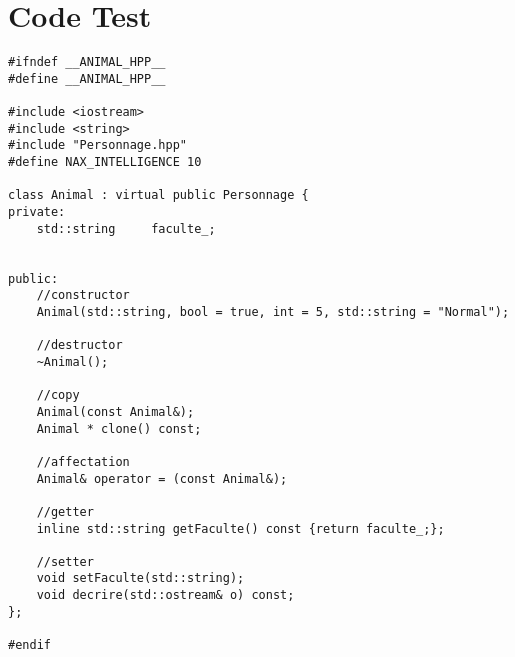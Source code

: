 \section{Code Test}
\begin{lstlisting}[style=c++]
#ifndef __ANIMAL_HPP__
#define __ANIMAL_HPP__

#include <iostream>
#include <string>
#include "Personnage.hpp"
#define NAX_INTELLIGENCE 10

class Animal : virtual public Personnage {
private:
	std::string 	faculte_;


public:
	//constructor
	Animal(std::string, bool = true, int = 5, std::string = "Normal");

	//destructor
	~Animal();

	//copy
	Animal(const Animal&);
	Animal * clone() const;

	//affectation
	Animal& operator = (const Animal&);

	//getter
	inline std::string getFaculte() const {return faculte_;};

	//setter
	void setFaculte(std::string);
	void decrire(std::ostream& o) const;
};

#endif
\end{lstlisting}

